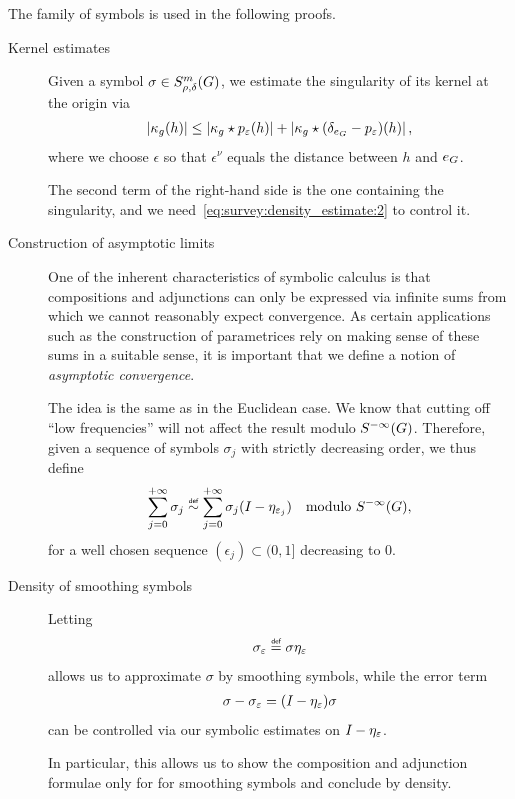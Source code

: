 The family of symbols is used in the following proofs.
\begin{description}
    \item[Kernel estimates]

        Given a symbol $\sigma \in S^{m}_{\rho, \delta}(G)$,
        we estimate the singularity of its kernel at the origin via
        \begin{align*}
            \left|{\kappa_g(h)}\right|
            \leq
            \left|{\kappa_g \star p_\varepsilon(h)}\right|
            +
            \left|{\kappa_g \star (\delta_{e_G} - p_\varepsilon)(h)}\right|,
        \end{align*}
        where we choose $\epsilon$ so that $\epsilon^\nu$ equals the distance between $h$ and $e_G$.

        The second term of the right-hand side is the one containing the singularity,
        and we need~\eqref{eq:survey:density_estimate:2} to control it.

    \item[Construction of asymptotic limits]

        One of the inherent characteristics of symbolic calculus is that compositions and adjunctions can only be expressed via infinite sums from which we cannot reasonably expect convergence.
        As certain applications such as the construction of parametrices rely on making sense of these sums in a suitable sense,
        it is important that we define a notion of \emph{asymptotic convergence}.

        The idea is the same as in the Euclidean case.
        We know that cutting off ``low frequencies'' will not affect the result modulo ${S^{-\infty} (G)}$.
        Therefore, given a sequence of symbols $\sigma_j$ with strictly decreasing order,
        we thus define
        \begin{align*}
            \sum_{j = 0}^{+\infty} \sigma_j \defsim
            \sum_{j = 0}^{+\infty} \sigma_j (\Id {} - \eta_{\epsilon_j})
            \quad \text{modulo } \SmoothingSymbols,
        \end{align*}
        for a well chosen sequence $(\epsilon_j) \subset (0, 1]$ decreasing to $0$.

    \item[Density of smoothing symbols]

        Letting
        \begin{align*}
            \sigma_\epsilon \defeq \sigma \eta_\epsilon
        \end{align*}
        allows us to approximate $\sigma$ by smoothing symbols,
        while the error term
        \begin{align*}
            \sigma - \sigma_\varepsilon = ({I_{}} - \eta_\varepsilon) \sigma
        \end{align*}
        can be controlled via our symbolic estimates on ${I_{}} - \eta_\varepsilon$.

        In particular,
        this allows us to show the composition and adjunction formulae only for
        for smoothing symbols and conclude by density.
\end{description}

